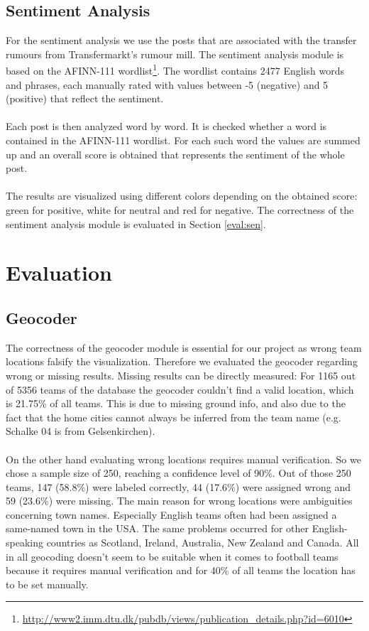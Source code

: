 \documentclass{article}
\begin{document}
\subsection{Sentiment Analysis}
\label{sentiment}
For the sentiment analysis we use the posts that are associated with the transfer rumours from Transfermarkt's rumour mill. The sentiment analysis module is based on the AFINN-111 wordlist\footnote{\url{http://www2.imm.dtu.dk/pubdb/views/publication_details.php?id=6010}}. The wordlist contains 2477 English words and phrases, each manually rated with values between -5 (negative) and 5 (positive) that reflect the sentiment. 
\\ \\
Each post is then analyzed word by word. It is checked whether a word is contained in the AFINN-111 wordlist. For each such word the values are summed up and an overall score is obtained that represents the sentiment of the whole post. 
\\ \\
The results are visualized using different colors depending on the obtained score: green for positive, white for neutral and red for negative. The correctness of the sentiment analysis module is evaluated in Section \ref{eval:sen}.

\section{Evaluation}
\subsection{Geocoder}
\label{eval:geo}
The correctness of the geocoder module is essential for our project as wrong team locations falsify the visualization. Therefore we evaluated the geocoder regarding wrong or missing results. Missing results can be directly measured: For 1165 out of 5356 teams of the database the geocoder couldn't find a valid location, which is 21.75\% of all teams. This is due to missing ground info, and also due to the fact that the home cities cannot always be inferred from the team name (e.g. Schalke 04 is from Gelsenkirchen). 
\\ \\
On the other hand evaluating wrong locations requires manual verification. So we chose a sample size of 250, reaching a confidence level of 90\%. Out of those 250 teams, 147 (58.8\%) were labeled correctly, 44 (17.6\%) were assigned wrong and 59 (23.6\%) were missing. The main reason for wrong locations were ambiguities concerning town names. Especially English teams often had been assigned a same-named town in the USA. The same problems occurred for other English-speaking countries as Scotland, Ireland, Australia, New Zealand and Canada. All in all geocoding doesn't seem to be suitable when it comes to football teams because it requires manual verification and for 40\% of all teams the location has to be set manually.
\end{document}
